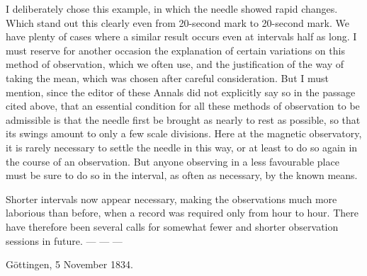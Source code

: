 I deliberately chose this example, in which the needle showed rapid changes. Which stand out this clearly even from 20-second mark to 20-second mark. We have plenty of cases where a similar result occurs even at intervals half as long. I must reserve for another occasion the explanation of certain variations on this method of observation, which we often use, and the justification of the way of taking the mean, which was chosen after careful consideration. But I must mention, since the editor of these Annals did not explicitly say so in the passage cited above, that an essential condition for all these methods of observation to be admissible is that the needle first be brought as nearly to rest as possible, so that its swings amount to only a few scale divisions. Here at the magnetic observatory, it is rarely necessary to settle the needle in this way, or at least to do so again in the course of an observation. But anyone observing in a less favourable place must be sure to do so in the interval, as often as necessary, by the known means.

Shorter intervals now appear necessary, making the observations much more laborious than before, when a record was required only from hour to hour. There have therefore been several calls for somewhat fewer and shorter observation sessions in future. — — —

Göttingen, 5 November 1834.

